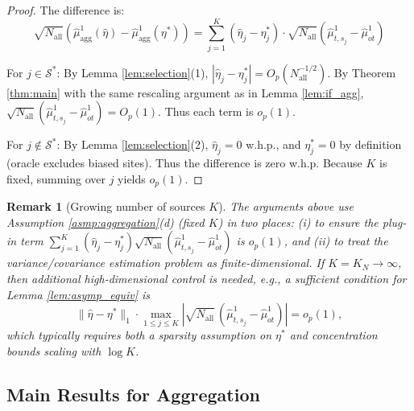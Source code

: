 \documentclass{article}
\newtheorem{remark}{Remark}[section]
\begin{document}
\begin{proof}
The difference is:
\[
\sqrt{N_{\mathrm{all}}}\left( \widehat{\mu}^1_{\text{agg}}(\widehat{\eta}) - \widehat{\mu}^1_{\text{agg}}(\eta^*) \right) = \sum_{j=1}^K (\widehat{\eta}_j - \eta^*_j) \cdot \sqrt{N_{\mathrm{all}}}(\widehat{\mu}^1_{t,s_j} - \widehat{\mu}^1_{ot})
\]

For $j \in \mathcal{S}^*$: By Lemma \ref{lem:selection}(1), $|\widehat{\eta}_j - \eta^*_j| = O_p(N_{\mathrm{all}}^{-1/2})$. By Theorem \ref{thm:main} with the same rescaling argument as in Lemma \ref{lem:if_agg}, $\sqrt{N_{\mathrm{all}}}(\widehat{\mu}^1_{t,s_j} - \widehat{\mu}^1_{ot}) = O_p(1)$. Thus each term is $o_p(1)$.

For $j \notin \mathcal{S}^*$: By Lemma \ref{lem:selection}(2), $\widehat{\eta}_j = 0$ w.h.p., and $\eta^*_j = 0$ by definition (oracle excludes biased sites). Thus the difference is zero w.h.p.
Because $K$ is fixed, summing over $j$ yields $o_p(1)$.
\end{proof}

\begin{remark}[Growing number of sources $K$]\label{rem:growing_k}
The arguments above use Assumption \ref{asmp:aggregation}(d) (fixed $K$) in two places: (i) to ensure the plug-in term $\sum_{j=1}^K(\widehat{\eta}_j-\eta_j^*)\sqrt{N_{\mathrm{all}}}(\widehat{\mu}^1_{t,s_j}-\widehat{\mu}^1_{ot})$ is $o_p(1)$, and (ii) to treat the variance/covariance estimation problem as finite-dimensional. If $K=K_N\to\infty$, then additional high-dimensional control is needed, e.g., a sufficient condition for Lemma \ref{lem:asymp_equiv} is
\[
\|\widehat{\eta}-\eta^*\|_1 \cdot \max_{1\le j\le K}\left|\sqrt{N_{\mathrm{all}}}\,(\widehat{\mu}^1_{t,s_j}-\widehat{\mu}^1_{ot})\right| = o_p(1),
\]
which typically requires both a sparsity assumption on $\eta^*$ and concentration bounds scaling with $\log K$.
\end{remark}

\subsection{Main Results for Aggregation}
\end{document}
